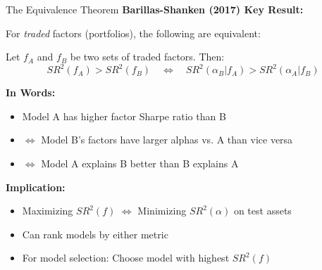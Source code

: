 \documentclass{beamer}
\begin{document}
\begin{frame}{The Equivalence Theorem}
    \textbf{Barillas-Shanken (2017) Key Result:}
    
    For \textit{traded} factors (portfolios), the following are equivalent:
    
    
    \begin{theorem}
    Let $f_A$ and $f_B$ be two sets of traded factors. Then:
    \begin{equation}\label{eq:equivalence}
        SR^2(f_A) > SR^2(f_B) \quad \Leftrightarrow \quad SR^2(\alpha_B | f_A) > SR^2(\alpha_A | f_B)
    \end{equation}
    \end{theorem}
    
    
    \textbf{In Words:}
    \begin{itemize}
        \item Model A has higher factor Sharpe ratio than B
        \item $\Leftrightarrow$ Model B's factors have larger alphas vs. A than vice versa
        \item $\Leftrightarrow$ Model A explains B better than B explains A
    \end{itemize}
    
    \vspace{0.3cm}
    \textbf{Implication:}
    \begin{itemize}
        \item Maximizing $SR^2(f)$ $\Leftrightarrow$ Minimizing $SR^2(\alpha)$ on test assets
        \item Can rank models by either metric
        \item For model selection: Choose model with highest $SR^2(f)$
    \end{itemize}
\end{frame}
\end{document}
